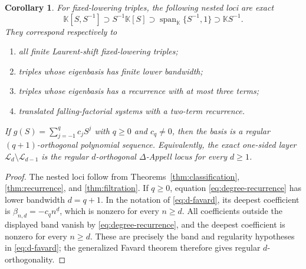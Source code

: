 \documentclass[11pt,reqno]{amsart}
\numberwithin{equation}{section}
\newtheorem{corollary}[theorem]{Corollary}
\theoremstyle{definition}
\theoremstyle{remark}
\newcommand{\K}{\mathbb K}
\newcommand{\calL}{\mathcal L}
\newcommand{\Span}{\operatorname{span}}
\newcommand{\fall}[2]{#1^{\underline{#2}}}
\begin{document}
\begin{corollary}\label{cor:d-orthogonal}
For fixed-lowering triples, the following nested loci are exact
\[
 \K[S,S^{-1}]
 \supset
 S^{-1}\K[S]
 \supset
 \Span_{\K}\{S^{-1},1\}
 \supset
 \K S^{-1}.
\]
They correspond respectively to
\begin{enumerate}[label=\textup{(\roman*)},leftmargin=2.3em]
\item all finite Laurent-shift fixed-lowering triples;
\item triples whose eigenbasis has finite lower bandwidth;
\item triples whose eigenbasis has a recurrence with at most three terms;
\item translated falling-factorial systems with a two-term recurrence.
\end{enumerate}
If $g(S)=\sum_{j=-1}^{q}c_jS^j$ with $q\ge0$ and $c_q\ne0$, then the basis is a regular $(q+1)$-orthogonal polynomial sequence.  Equivalently, the exact one-sided layer $\calL_d\setminus\calL_{d-1}$ is the regular $d$-orthogonal $\Delta$-Appell locus for every $d\ge1$.
\end{corollary}

\begin{proof}
The nested loci follow from Theorems~\ref{thm:classification}, \ref{thm:recurrence}, and \ref{thm:filtration}.  If $q\ge0$, equation \eqref{eq:degree-recurrence} has lower bandwidth $d=q+1$.  In the notation of \eqref{eq:d-favard}, its deepest coefficient is $\beta_{n,d}=-c_q\fall{n}{d}$, which is nonzero for every $n\ge d$.  All coefficients outside the displayed band vanish by \eqref{eq:degree-recurrence}, and the deepest coefficient is nonzero for every $n\ge d$.  These are precisely the band and regularity hypotheses in \eqref{eq:d-favard}; the generalized Favard theorem therefore gives regular $d$-orthogonality.
\end{proof}
\end{document}
